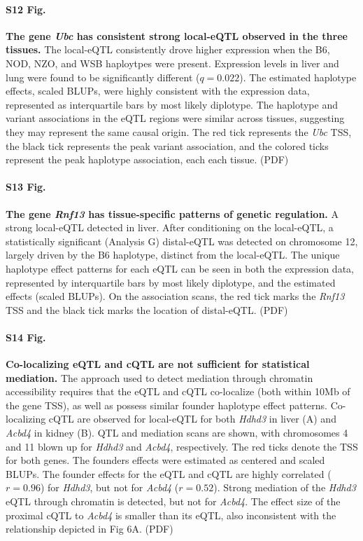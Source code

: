 \documentclass[10pt,letterpaper]{article}
\begin{document}
\paragraph*{S12 Fig.}
\label{S_ubc_correlated_eqtl}
{\bf The gene \textit{Ubc} has consistent strong local-eQTL observed in the three tissues.}
The local-eQTL consistently drove higher expression when the B6, NOD, NZO, and WSB haploytpes were present. Expression levels in liver and lung were found to be significantly different ($q = 0.022$). The estimated haplotype effects, scaled BLUPs, were highly consistent with the expression data, represented as interquartile bars by most likely diplotype. The haplotype and variant associations in the eQTL regions were similar across tissues, suggesting they may represent the same causal origin. The red tick represents the \textit{Ubc} TSS, the black tick represents the peak variant association, and the colored ticks represent the peak haplotype association, each each tissue. (PDF)

\paragraph*{S13 Fig.}
\label{S_rnf13_distal_eqtl}
{\bf The gene \textit{Rnf13} has tissue-specific patterns of genetic regulation.}
A strong local-eQTL detected in liver. After conditioning on the local-eQTL, a statistically significant (Analysis G) distal-eQTL was detected on chromosome 12, largely driven by the B6 haplotype, distinct from the local-eQTL. The unique haplotype effect patterns for each eQTL can be seen in both the expression data, represented by interquartile bars by most likely diplotype, and the estimated effects (scaled BLUPs). On the association scans, the red tick marks the \textit{Rnf13} TSS and the black tick marks the location of distal-eQTL. (PDF)

\paragraph*{S14 Fig.}
\label{S_colocalization}
{\bf Co-localizing eQTL and cQTL are not sufficient for statistical mediation.}
The approach used to detect mediation through chromatin accessibility requires that the eQTL and cQTL co-localize (both within 10Mb of the gene TSS), as well as possess similar founder haplotype effect patterns. Co-localizing cQTL are observed for local-eQTL for both \textit{Hdhd3} in liver (A) and \textit{Acbd4} in kidney (B). QTL and mediation scans are shown, with chromosomes 4 and 11 blown up for \textit{Hdhd3} and \textit{Acbd4}, respectively. The red ticks denote the TSS for both genes. The founders effects were estimated as centered and scaled BLUPs. The founder effects for the eQTL and cQTL are highly correlated ($r = 0.96$) for \textit{Hdhd3}, but not for \textit{Acbd4} ($r = 0.52$). Strong mediation of the \textit{Hdhd3} eQTL through chromatin is detected, but not for \textit{Acbd4}. The effect size of the proximal cQTL to \textit{Acbd4} is smaller than its eQTL, also inconsistent with the relationship depicted in Fig 6A. (PDF)
\end{document}
